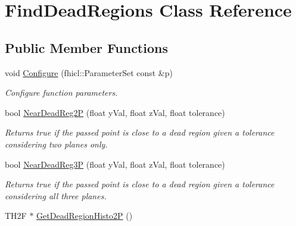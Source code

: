 \hypertarget{classFindDeadRegions}{\section{\-Find\-Dead\-Regions \-Class \-Reference}
\label{classFindDeadRegions}
}
\subsection*{\-Public \-Member \-Functions}
\begin{DoxyCompactItemize}
\item 
\hypertarget{classFindDeadRegions_a94b207b673c58df861537ead4ec5385a}{void \hyperlink{classFindDeadRegions_a94b207b673c58df861537ead4ec5385a}{\-Configure} (fhicl\-::\-Parameter\-Set const \&p)}\label{classFindDeadRegions_a94b207b673c58df861537ead4ec5385a}

\begin{DoxyCompactList}\small\item\em \-Configure function parameters. \end{DoxyCompactList}\item 
\hypertarget{classFindDeadRegions_a7a884dc4685e66734b98afea9a2c6c21}{bool \hyperlink{classFindDeadRegions_a7a884dc4685e66734b98afea9a2c6c21}{\-Near\-Dead\-Reg2\-P} (float y\-Val, float z\-Val, float tolerance)}\label{classFindDeadRegions_a7a884dc4685e66734b98afea9a2c6c21}

\begin{DoxyCompactList}\small\item\em \-Returns true if the passed point is close to a dead region given a tolerance considering two planes only. \end{DoxyCompactList}\item 
\hypertarget{classFindDeadRegions_a2ef76eca81785361bf95c17e8e1a7574}{bool \hyperlink{classFindDeadRegions_a2ef76eca81785361bf95c17e8e1a7574}{\-Near\-Dead\-Reg3\-P} (float y\-Val, float z\-Val, float tolerance)}\label{classFindDeadRegions_a2ef76eca81785361bf95c17e8e1a7574}

\begin{DoxyCompactList}\small\item\em \-Returns true if the passed point is close to a dead region given a tolerance considering all three planes. \end{DoxyCompactList}\item 
\hypertarget{classFindDeadRegions_a712767abce6132b0dd6638a335da87fa}{\-T\-H2\-F $\ast$ \hyperlink{classFindDeadRegions_a712767abce6132b0dd6638a335da87fa}{\-Get\-Dead\-Region\-Histo2\-P} ()}\label{classFindDeadRegions_a712767abce6132b0dd6638a335da87fa}


\end{DoxyCompactItemize}
